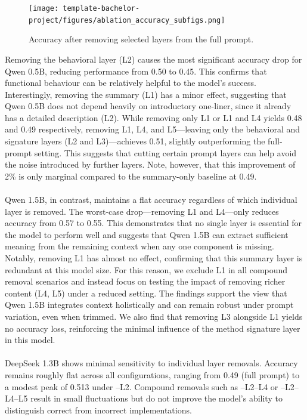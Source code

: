 \documentclass[a4paper]{usiinfbachelorproject}
\begin{document}
\begin{figure}[H]\centering
  \texttt{[image: template-bachelor-project/figures/ablation\_accuracy\_subfigs.png]}
  \caption{Accuracy after removing selected layers from the full prompt.}
  \label{fig:ablation-accuracy}
\end{figure}
\noindent
Removing the behavioral layer (L2) causes the most significant accuracy drop for Qwen 0.5B, reducing performance from 0.50 to 0.45. This confirms that functional behaviour can be relatively helpful to the model's success. Interestingly, removing the summary (L1) has a minor effect, suggesting that Qwen 0.5B does not depend heavily on introductory one-liner, since it already has a detailed description (L2). While removing only L1 or L1 and L4 yields 0.48 and 0.49 respectively, removing L1, L4, and L5—leaving only the behavioral and signature layers (L2 and L3)—achieves 0.51, slightly outperforming the full-prompt setting. This suggests that cutting certain prompt layers can help avoid the noise introduced by further layers. Note, however, that this improvement of 2\% is only marginal compared to the summary-only baseline at 0.49. \\
\\
Qwen 1.5B, in contrast, maintains a flat accuracy regardless of which individual layer is removed. The worst-case drop—removing L1 and L4—only reduces accuracy from 0.57 to 0.55. This demonstrates that no single layer is essential for the model to perform well and suggests that Qwen 1.5B can extract sufficient meaning from the remaining context when any one component is missing. Notably, removing L1 has almost no effect, confirming that this summary layer is redundant at this model size. For this reason, we exclude L1 in all compound removal scenarios and instead focus on testing the impact of removing richer content (L4, L5) under a reduced setting. The findings support the view that Qwen 1.5B integrates context holistically and can remain robust under prompt variation, even when trimmed. We also find that removing L3 alongside L1 yields no accuracy loss, reinforcing the minimal influence of the method signature layer in this model. \\
\\
DeepSeek 1.3B shows minimal sensitivity to individual layer removals. Accuracy remains roughly flat across all configurations, ranging from 0.49 (full prompt) to a modest peak of 0.513 under –L2. Compound removals such as –L2–L4 or –L2–L4–L5 result in small fluctuations but do not improve the model’s ability to distinguish correct from incorrect implementations.
\end{document}
